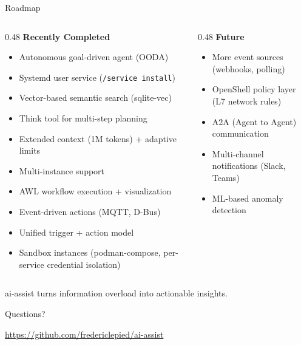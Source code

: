 \documentclass[aspectratio=169,10pt]{beamer}
\begin{document}
\begin{frame}{Roadmap}
\begin{columns}[T]
\begin{column}{0.48\textwidth}
\textbf{Recently Completed}
\begin{itemize}\scriptsize\setlength{\itemsep}{1pt}
  \item \textcolor{green!60!black}{\checkmark} \alert{Autonomous goal-driven agent (OODA)}
  \item \textcolor{green!60!black}{\checkmark} Systemd user service (\texttt{/service install})
  \item \textcolor{green!60!black}{\checkmark} Vector-based semantic search (sqlite-vec)
  \item \textcolor{green!60!black}{\checkmark} Think tool for multi-step planning
  \item \textcolor{green!60!black}{\checkmark} Extended context (1M tokens) + adaptive limits
  \item \textcolor{green!60!black}{\checkmark} Multi-instance support
  \item \textcolor{green!60!black}{\checkmark} AWL workflow execution + visualization
  \item \textcolor{green!60!black}{\checkmark} \alert{Event-driven actions} (MQTT, D-Bus)
  \item \textcolor{green!60!black}{\checkmark} Unified trigger + action model
  \item \textcolor{green!60!black}{\checkmark} \alert{Sandbox instances} (podman-compose, per-service credential isolation)
\end{itemize}
\end{column}
\begin{column}{0.48\textwidth}
\textbf{Future}
\begin{itemize}\scriptsize\setlength{\itemsep}{1pt}
  \item More event sources (webhooks, polling)
  \item OpenShell policy layer (L7 network rules)
  \item A2A (Agent to Agent) communication
  \item Multi-channel notifications (Slack, Teams)
  \item ML-based anomaly detection
\end{itemize}
\end{column}
\end{columns}

\vfill
\centering
\large\color{rhred}
ai-assist turns information overload into actionable insights.

\medskip
\normalsize\color{rhdarkgray} Questions?

\smallskip
\small\url{https://github.com/fredericlepied/ai-assist}
\end{frame}
\end{document}
